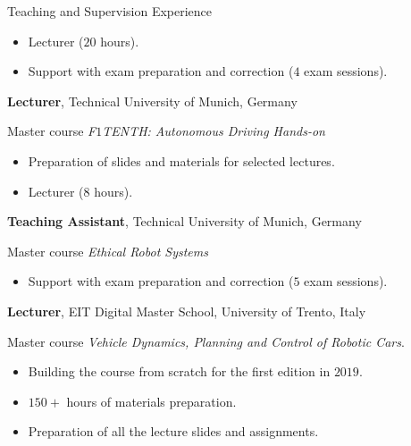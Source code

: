 \begin{rubric}{Teaching and Supervision Experience}
\begin{itemize}
        \item Lecturer ($20$ hours).\vspace{-0.35cm}
        \item Support with exam preparation and correction ($4$ exam sessions).
    \end{itemize}
%
\entry*[07/2025 -- present]%
	\textbf{Lecturer}, Technical University of Munich, Germany
    \par Master course \textit{F$1$TENTH: Autonomous Driving Hands-on} 
    \vspace{-0.3cm}
    \begin{itemize}
        \item Preparation of slides and materials for selected lectures.\vspace{-0.35cm}
        \item Lecturer ($8$ hours).\vspace{-0.35cm}
    \end{itemize}
%
\vspace{0.3cm}
\entry*[07/2025 -- present]%
	\textbf{Teaching Assistant}, Technical University of Munich, Germany
    \par Master course \textit{Ethical Robot Systems}
    \vspace{-0.3cm}
    \begin{itemize}
        \item Support with exam preparation and correction ($5$ exam sessions).
    \end{itemize}
%
\vspace{-0.1cm}
\entry*[\begin{tabular}{@{}r@{}}
        09/2021 -- 02/2022\\
        09/2020 -- 02/2021\\
        11/2019 -- 02/2020
        \end{tabular}]%
	\textbf{Lecturer}, EIT Digital Master School, University of Trento, Italy
    \par Master course \textit{Vehicle Dynamics, Planning and Control of Robotic Cars}.
    \vspace{-0.3cm}
    \begin{itemize}
        \item Building the course from scratch for the first edition in $2019$.\vspace{-0.35cm}
        \item $150+$ hours of materials preparation.\vspace{-0.35cm}
        \item Preparation of all the lecture slides and assignments.\vspace{-0.35cm}

\end{itemize}
\end{rubric}
